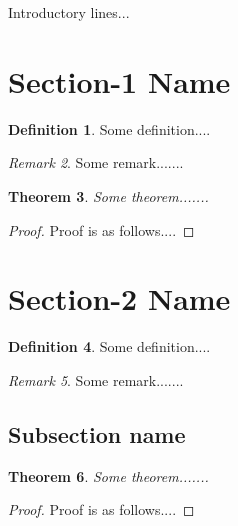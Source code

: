 \documentclass[12pt,a4paper]{report}
\theoremstyle{plain}
\newtheorem{theorem}{Theorem}[section]
\theoremstyle{definition}
\newtheorem{definition}[theorem]{Definition}
\theoremstyle{remark}
\newtheorem{remark}[theorem]{Remark}
\begin{document}
Introductory lines...



\section{Section-1 Name}
\begin{definition}\label{abc7}
Some definition....
\end{definition}

\begin{remark}
Some remark.......
\end{remark}



\begin{theorem}
Some theorem.......
\end{theorem}

\begin{proof}
Proof is as follows....
\end{proof}

\section{Section-2 Name}
\begin{definition}\label{abc8}
Some definition....
\end{definition}

\begin{remark}
Some remark.......
\end{remark}

\subsection{Subsection name}

\begin{theorem}
Some theorem.......
\end{theorem}

\begin{proof}
Proof is as follows....
\end{proof}


\nocite{laan}\nocite{rqhassin}\nocite{stidham}\nocite{gross}\nocite{osborne}\nocite{ferreira}



\end{document}

